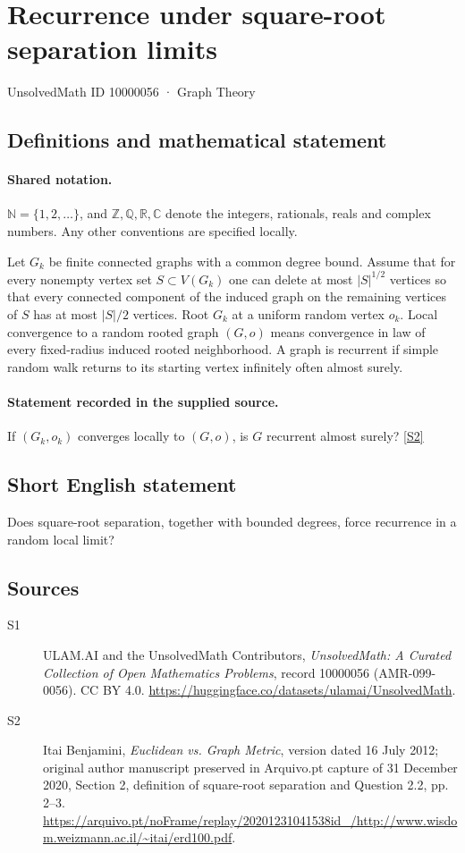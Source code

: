 \documentclass[11pt]{article}
\newcommand{\sref}[2]{\hyperlink{source:#1:#2}{[S#2]}}
\begin{document}
\setcounter{section}{10000055}
\section{Recurrence under square-root separation limits}\label{10000056}
{\small\sffamily UnsolvedMath ID 10000056 · Graph Theory}
\subsection{Definitions and mathematical statement}

\paragraph{Shared notation.}$\mathbb N=\{1,2,\ldots\}$, and $\mathbb Z,\mathbb Q,\mathbb R,\mathbb C$ denote the integers, rationals, reals and complex numbers. Any other conventions are specified locally.


Let $G_k$ be finite connected graphs with a common degree bound. Assume that for every nonempty vertex set $S\subset V(G_k)$ one can delete at most $|S|^{1/2}$ vertices so that every connected component of the induced graph on the remaining vertices of $S$ has at most $|S|/2$ vertices. Root $G_k$ at a uniform random vertex $o_k$. Local convergence to a random rooted graph $(G,o)$ means convergence in law of every fixed-radius induced rooted neighborhood. A graph is recurrent if simple random walk returns to its starting vertex infinitely often almost surely.
\paragraph{Statement recorded in the supplied source.}
If $(G_k,o_k)$ converges locally to $(G,o)$, is $G$ recurrent almost surely? \sref{10000056}{2}
\subsection{Short English statement}
Does square-root separation, together with bounded degrees, force recurrence in a random local limit?
\subsection{Sources}
\begin{description}
\item[\hypertarget{source:10000056:1}{S1}] ULAM.AI and the UnsolvedMath Contributors, \emph{UnsolvedMath: A Curated Collection of Open Mathematics Problems}, record 10000056 (AMR-099-0056). CC BY 4.0. \url{https://huggingface.co/datasets/ulamai/UnsolvedMath}.
\item[\hypertarget{source:10000056:2}{S2}] Itai Benjamini, \emph{Euclidean vs. Graph Metric}, version dated 16 July 2012; original author manuscript preserved in Arquivo.pt capture of 31 December 2020, Section 2, definition of square-root separation and Question 2.2, pp. 2--3. \url{https://arquivo.pt/noFrame/replay/20201231041538id_/http://www.wisdom.weizmann.ac.il/~itai/erd100.pdf}.
\end{description}
\label{end:10000056}
\end{document}
